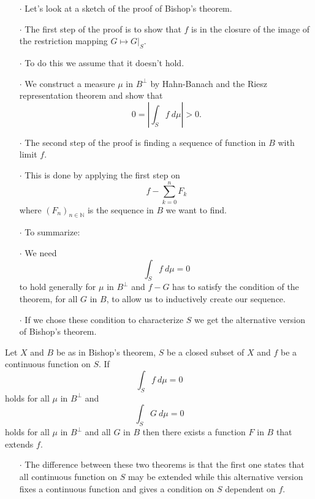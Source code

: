 \documentclass{beamer}
\begin{document}
\begin{frame}
\begin{enumerate}
\item[$\cdot$] Let's look at a sketch of the proof of Bishop's theorem.
\item[$\cdot$] The first step of the proof is to show that $f$ is in the closure of the image of the restriction mapping $G \mapsto G|_S$.
\item[$\cdot$] To do this we assume that it doesn't hold.
\item[$\cdot$] We construct a measure $\mu$ in $B^{\perp}$ by Hahn-Banach and the Riesz representation theorem and show that
\[
	0 = \left | \int_S f\ d\mu \right | > 0.
\]
\item[$\cdot$] The second step of the proof is finding a sequence of function in $B$ with limit $f$.
\item[$\cdot$] This is done by applying the first step on
\[
	f - \sum_{k = 0}^n F_k
\]
where $(F_n)_{n \in \mathbb{N}}$ is the sequence in $B$ we want to find.
\end{enumerate}
\end{frame}

\begin{frame}
\begin{enumerate}
\item[$\cdot$] To summarize:
\item[$\cdot$]
We need
\[
	\int_S f\ d\mu = 0
\]
to hold generally for $\mu$ in $B^{\perp}$ and $f - G$ has to satisfy the condition of the theorem, for all $G$ in $B$, to allow us to inductively create our sequence.
\item[$\cdot$] If we chose these condition to characterize $S$ we get the alternative version of Bishop's theorem.
\end{enumerate}
\end{frame}

\begin{frame}
\begin{theorem}
Let $X$ and $B$ be as in Bishop's theorem, $S$ be a closed subset of $X$ and $f$ be a continuous function on $S$.
If
\[
	\int_S f\ d\mu = 0
\]
holds for all $\mu$ in $B^{\perp}$ and
\[
	\int_S G\ d\mu = 0
\]
holds for all $\mu$ in $B^{\perp}$ and all $G$ in $B$ then there exists a function $F$ in $B$ that extends $f$.
\end{theorem}
\end{frame}

\begin{frame}
\begin{enumerate}
\item[$\cdot$] The difference between these two theorems is that the first one states that all continuous function on $S$ may be extended while this alternative version fixes a continuous function and gives a condition on $S$ dependent on $f$.
\end{enumerate}
\end{frame}
\end{document}
